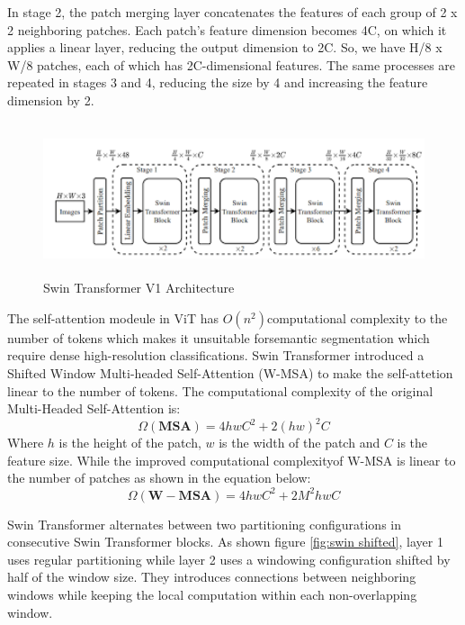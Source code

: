 In stage 2, the patch merging layer concatenates the features of each group of 2 x 2 neighboring patches. Each patch’s feature dimension becomes 4C, on which it applies a linear layer, reducing the output dimension to 2C. So, we have H/8 x W/8 patches, each of which has 2C-dimensional features. The same processes are repeated in stages 3 and 4, reducing the size by 4 and increasing the feature dimension by 2.

\FloatBarrier
\begin{figure}[ht]
\includegraphics[width=11.5cm, height=4.5cm]{images/swin-transformer-4block.png}
\centering
\caption{Swin Transformer V1 Architecture \protect\cite{swin-v1}}
\label{fig:swin architecture1}
\end{figure}

The self-attention modeule in ViT has $O(n^2) $computational complexity to the number of tokens which makes it unsuitable forsemantic segmentation which require dense high-resolution classifications. Swin Transformer introduced a Shifted Window Multi-headed Self-Attention (W-MSA) to make the self-attetion linear to the number of tokens. The computational complexity of the original Multi-Headed Self-Attention is:
\begin{equation}
    \Omega (\mathbf{MSA}) = 4hwC^2 + 2(hw)^2C
\end{equation}
Where $h$ is the height of the patch, $w$ is the width of the patch and $C$ is the feature size. While the improved computational complexityof W-MSA is linear to the number of patches as shown in the equation below:
\begin{equation}
    \Omega (\mathbf{W-MSA}) = 4hwC^2 + 2M^2hwC
\end{equation}

Swin Transformer alternates between two partitioning configurations in consecutive Swin Transformer blocks. As shown figure \ref{fig:swin shifted}, layer 1 uses regular partitioning while layer 2 uses a windowing configuration shifted by half of the window size. They introduces connections between neighboring windows while keeping the local computation within each non-overlapping window.

